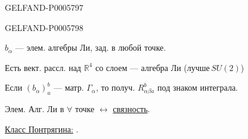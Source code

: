 \begin{GelfandAdjacentEvidence}{GELFAND-P000579}{7}

\end{GelfandAdjacentEvidence}
\begin{GelfandAdjacentEvidence}{GELFAND-P000579}{8}


\(b_\alpha\) — элем. алгебры Ли, зад. в любой точке.

Есть вект. рассл. над \(\mathbb R^4\) со слоем — алгебра Ли (\(\text{лучше}\,SU(2)\))

Если \((b_\alpha)_a^b\) — матр. \(\Gamma_\alpha\), то получ.
\(R_{\alpha\beta a}^b\) под знаком интеграла.

Элем. Алг. Ли в \(\forall\) точке \(\longleftrightarrow\) \underline{связность}.

\underline{Класс Понтрягина:}\quad
{}.
\end{GelfandAdjacentEvidence}



